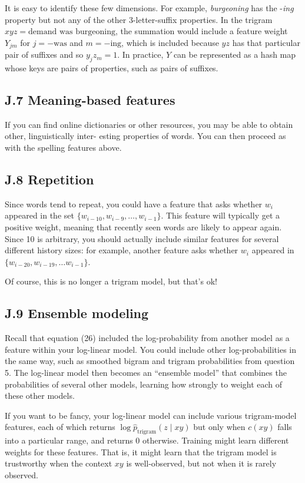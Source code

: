 It is easy to identify these few dimensions. For example, \emph{burgeoning} has the -\emph{ing} property but 
not any of the other 3-letter-suffix properties. In the trigram $xyz = \text{demand was burgeoning}$, the 
summation would include a feature weight $Y_{jm}$ for $j = -\text{was}$ and $m = -\text{ing}$, which is included because 
$yz$ has that particular pair of suffixes and so $y_j z_m = 1$. In practice, $Y$ can be represented as a hash map 
whose keys are pairs of properties, such as pairs of suffixes.

\subsection*{J.7 Meaning-based features}

If you can find online dictionaries or other resources, you may be able to obtain other, linguistically inter-
esting properties of words. You can then proceed as with the spelling features above.

\subsection*{J.8 Repetition}

Since words tend to repeat, you could have a feature that asks whether $w_i$ appeared in the set $\{w_{i-10}, w_{i-9}, \ldots, w_{i-1}\}$. 
This feature will typically get a positive weight, meaning that recently seen words are likely to appear again. 
Since 10 is arbitrary, you should actually include similar features for several different history sizes: for 
example, another feature asks whether $w_i$ appeared in $\{w_{i-20}, w_{i-19}, \ldots w_{i-1}\}$. 

Of course, this is no longer a trigram model, but that’s ok! 

\subsection*{J.9 Ensemble modeling}

Recall that equation (26) included the log-probability from another model as a feature within your log-linear 
model. You could include other log-probabilities in the same way, such as smoothed bigram and trigram 
probabilities from question 5. The log-linear model then becomes an “ensemble model” that combines the 
probabilities of several other models, learning how strongly to weight each of these other models. 

If you want to be fancy, your log-linear model can include various trigram-model features, each of 
which returns $\log \hat{p}_{\text{trigram}}(z \mid xy)$ but only when $c(xy)$ falls into a particular range, and returns 0 otherwise. 
Training might learn different weights for these features. That is, it might learn that the trigram model is 
trustworthy when the context $xy$ is well-observed, but not when it is rarely observed. 




